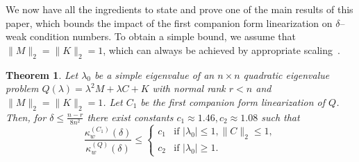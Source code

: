 \documentclass[12pt]{article}
\newtheorem{theorem}{Theorem}[section]
\begin{document}
We now have all the ingredients to state and prove one of the main results of this paper, which bounds the impact of the first companion form linearization on $\delta$--weak condition numbers. To obtain a simple bound, we assume that $\|M\|_2 = \|K\|_2 = 1$, which can always be achieved by appropriate scaling~\cite{Fan2004,zeng2014backward}.
\begin{theorem}\label{t:FCFratio}
    Let $\lambda_0$ be a simple eigenvalue of an $n \times n$ quadratic eigenvalue problem $Q(\lambda) = \lambda^2 M + \lambda C + K$ with normal rank $r<n$ and $\|M\|_2 = \|K\|_2 = 1$. Let $C_1$ be the first companion form linearization of $Q$. Then, for $\delta \leq \frac{n-r}{8n^2}$ there exist constants $c_1 \approx 1.46, c_2 \approx 1.08$ such that
\[
        \frac{\kappa^{(C_1)}_w(\delta)}{\kappa^{(Q)}_w(\delta)} \leq \begin{cases}
        c_1 & \text{if } |\lambda_0|\leq 1, \|C\|_2 \leq 1,\\
        c_2 & \text{if } |\lambda_0|\geq 1.
        \end{cases}
\]
\end{theorem}
\end{document}
